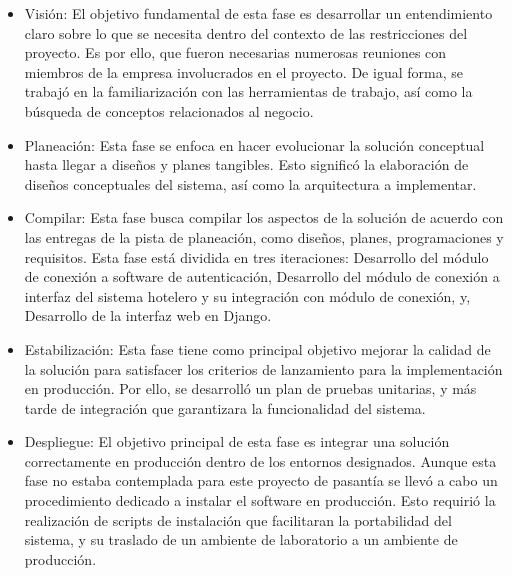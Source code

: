 \begin{itemize}[noitemsep,nolistsep]
\item Visión: El objetivo fundamental de esta fase es desarrollar un entendimiento claro sobre lo que se necesita dentro del contexto de las restricciones del proyecto. Es por ello, que fueron necesarias numerosas reuniones con miembros de la empresa involucrados en el proyecto. De igual forma, se trabajó en la familiarización con las herramientas de trabajo, así como la búsqueda de conceptos relacionados al negocio.
\item Planeación: Esta fase se enfoca en hacer evolucionar la solución conceptual hasta llegar a diseños y planes tangibles. Esto significó la elaboración de diseños conceptuales del sistema, así como la arquitectura a implementar.
\item Compilar: Esta fase busca compilar los aspectos de la solución de acuerdo con las entregas de la pista de planeación, como diseños, planes, programaciones y requisitos. Esta fase está dividida en tres iteraciones: Desarrollo del módulo de conexión a software de autenticación, Desarrollo del módulo de conexión a interfaz del sistema hotelero y su integración con módulo de conexión, y, Desarrollo de la interfaz web en Django.
\item Estabilización: Esta fase tiene como principal objetivo mejorar la calidad de la solución para satisfacer los criterios de lanzamiento para la implementación en producción. Por ello, se desarrolló un plan de pruebas unitarias, y más tarde de integración que garantizara la funcionalidad del sistema.
\item Despliegue: El objetivo principal de esta fase es integrar una solución correctamente en producción dentro de los entornos designados. Aunque esta fase no estaba contemplada para este proyecto de pasantía se llevó a cabo un procedimiento dedicado a instalar el software en producción. Esto requirió la realización de scripts de instalación que facilitaran la portabilidad del sistema, y su traslado de un ambiente de laboratorio a un ambiente de producción.
\end{itemize}

